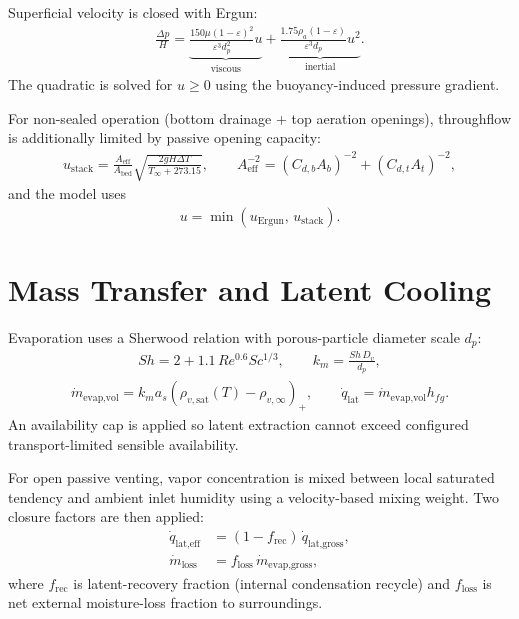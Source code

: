 \documentclass[11pt]{article}
\begin{document}
Superficial velocity is closed with Ergun:
\begin{align}
\frac{\Delta p}{H}=
\underbrace{\frac{150\mu(1-\varepsilon)^2}{\varepsilon^3 d_p^2}u}_{\text{viscous}}
+
\underbrace{\frac{1.75\rho_a(1-\varepsilon)}{\varepsilon^3 d_p}u^2}_{\text{inertial}}.
\end{align}
The quadratic is solved for $u\ge0$ using the buoyancy-induced pressure gradient.

For non-sealed operation (bottom drainage + top aeration openings), throughflow is
additionally limited by passive opening capacity:
\begin{align}
u_{\text{stack}} =
\frac{A_{\text{eff}}}{A_{\text{bed}}}
\sqrt{\frac{2gH\Delta T}{T_\infty+273.15}},
\qquad
A_{\text{eff}}^{-2} = (C_{d,b}A_b)^{-2} + (C_{d,t}A_t)^{-2},
\end{align}
and the model uses
\begin{align}
u = \min\left(u_{\text{Ergun}},\,u_{\text{stack}}\right).
\end{align}

\section{Mass Transfer and Latent Cooling}
Evaporation uses a Sherwood relation with porous-particle diameter scale $d_p$:
\begin{align}
Sh = 2 + 1.1\,Re^{0.6}Sc^{1/3},
\qquad k_m = \frac{Sh\,D_v}{d_p},
\end{align}
\begin{align}
\dot m_{\text{evap,vol}} = k_m a_s\left(\rho_{v,\text{sat}}(T)-\rho_{v,\infty}\right)_+,
\qquad
\dot q_{\text{lat}} = \dot m_{\text{evap,vol}} h_{fg}.
\end{align}
An availability cap is applied so latent extraction cannot exceed configured
transport-limited sensible availability.

For open passive venting, vapor concentration is mixed between local saturated tendency
and ambient inlet humidity using a velocity-based mixing weight. Two closure factors are
then applied:
\begin{align}
\dot q_{\text{lat,eff}} &= (1-f_{\text{rec}})\,\dot q_{\text{lat,gross}}, \\
\dot m_{\text{loss}} &= f_{\text{loss}}\,\dot m_{\text{evap,gross}},
\end{align}
where $f_{\text{rec}}$ is latent-recovery fraction (internal condensation recycle)
and $f_{\text{loss}}$ is net external moisture-loss fraction to surroundings.
\end{document}
